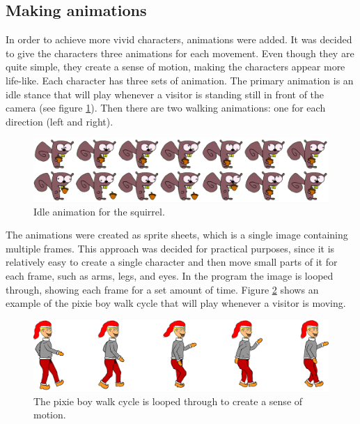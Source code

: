 \subsection{Making animations}
In order to achieve more vivid characters, animations were added. It was decided to give the characters three animations for each movement. Even though they are quite simple, they create a sense of motion, making the characters appear more life-like. Each character has three sets of animation. The primary animation is an idle stance that will play whenever a visitor is standing still in front of the camera (see figure \ref{fig:squirrel_animation}). Then there are two walking animations: one for each direction (left and right).

\begin{figure}[htbp]
\centering
\includegraphics[width=1.00\textwidth]{Pictures/Design/squirrel_animation}
\caption{Idle animation for the squirrel.}
\label{fig:squirrel_animation}
\end{figure}

The animations were created as sprite sheets, which is a single image containing multiple frames. This approach was decided for practical purposes, since it is relatively easy to create a single character and then move small parts of it for each frame, such as arms, legs, and eyes. In the program the image is looped through, showing each frame for a set amount of time. Figure \ref{fig:Design_PixieBoyWalking} shows an example of the pixie boy walk cycle that will play whenever a visitor is moving.

\begin{figure}[htbp]
\centering
\includegraphics[width=1.00\textwidth]{Pictures/Design/PixieWalking.png}
\caption{The pixie boy walk cycle is looped through to create a sense of motion.}
\label{fig:Design_PixieBoyWalking}
\end{figure}